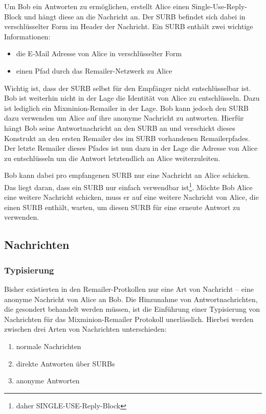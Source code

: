 Um Bob ein Antworten zu ermöglichen, erstellt Alice einen Single-Use-Reply-Block und hängt diese an die Nachricht an. Der SURB befindet sich dabei in verschlüsselter Form im Header der Nachricht. 
Ein SURB enthält zwei wichtige Informationen:
\begin{itemize}
\item die E-Mail Adresse von Alice in verschlüsselter Form
\item einen Pfad durch das Remailer-Netzwerk zu Alice
\end{itemize}

Wichtig ist, dass der SURB selbst für den Empfänger nicht entschlüsselbar ist. Bob ist weiterhin nicht in der Lage die Identität von Alice zu entschlüsseln. Dazu ist lediglich ein Mixminion-Remailer in der Lage. Bob kann jedoch den SURB dazu verwenden um Alice auf ihre anonyme Nachricht zu antworten. Hierfür hängt Bob seine Antwortnachricht an den SURB an und verschickt dieses Konstrukt an den ersten Remailer des im SURB vorhandenen Remailerpfades. Der letzte Remailer dieses Pfades ist nun dazu in der Lage die Adresse von Alice zu entschlüsseln um die Antwort letztendlich an Alice weiterzuleiten.

Bob kann dabei pro empfangenen SURB nur eine Nachricht an Alice schicken. Das liegt daran, dass ein SURB nur einfach verwendbar ist\footnote{daher SINGLE-USE-Reply-Block}. Möchte Bob Alice eine weitere Nachricht schicken, muss er auf eine weitere Nachricht von Alice, die einen SURB enthält, warten, um diesen SURB für eine erneute Antwort zu verwenden.

\subsection{Nachrichten}
\subsubsection{Typisierung}
Bisher existierten in den Remailer-Protkollen nur eine Art von Nachricht -- eine anonyme Nachricht von Alice an Bob. Die Hinzunahme von Antwortnachrichten, die gesondert behandelt werden müssen, ist die Einführung einer Typisierung von Nachrichten für das Mixminion-Remailer Protokoll unerlässlich. Hierbei werden zwischen drei Arten von Nachrichten unterschieden:

\begin{enumerate}
\item normale Nachrichten
\item direkte Antworten über SURBs
\item anonyme Antworten
\end{enumerate}

